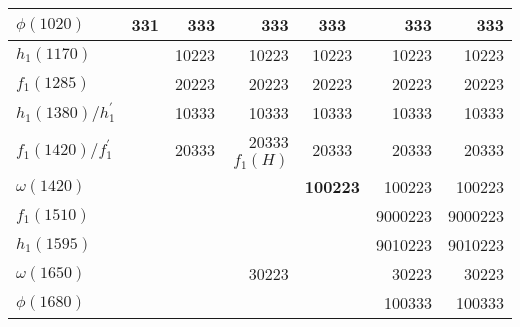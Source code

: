 \begin{tabular}{|l@{\tstrut}|r|r|r|c|r|r|}
$\phi(1020)$           &   331 &   333 &   333                &   333 &     333 & 333   \\ \hline
$h_1(1170)$            &       & 10223 & 10223                & 10223 &   10223 & 10223 \\ \hline
$f_1(1285)$            &       & 20223 & 20223                & 20223 &   20223 & 20223 \\ \hline
$h_1(1380)/h_1^\prime$ &       & 10333 & 10333                & 10333 &   10333 & 10333 \\ \hline
$f_1(1420)/f_1^\prime$ &       & 20333 & 20333 $f_1(H)$       & 20333 &   20333 & 20333 \\ \hline
$\omega(1420)$         &       &       &                      & \bf{100223} &  100223 & 100223 \\ \hline
$f_1(1510)$            &       &       &                      &       & 9000223 & 9000223 \\ \hline
$h_1(1595)$            &       &       &                      &       & 9010223 & 9010223 \\ \hline
$\omega(1650)$         &       &       & 30223                &       &   30223 & 30223 \\ \hline
$\phi(1680)$           &       &       &                      &       &  100333 & 100333 \\ \hline
\end{tabular}

